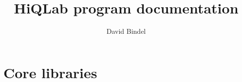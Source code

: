 \documentclass{report}
\title{HiQLab program documentation}
\author{David Bindel}
\begin{document}
\maketitle
\tableofcontents

\chapter{Core libraries}




\end{document}
